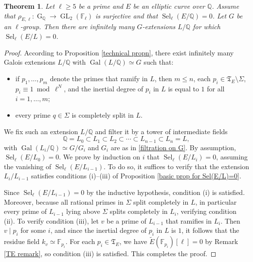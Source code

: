 \documentclass[11pt,reqno]{amsart}
\newtheorem{theorem}{Theorem}[section]
\newcommand{\Q}{\mathbb{Q}}
\newcommand{\F}{\mathbb{F}}
\newcommand{\op}[1]{\operatorname{#1}}
\numberwithin{equation}{section}
\begin{document}
\begin{theorem}\label{thm of section 3}
    Let $\ell\geq 5$ be a prime and $E$ be an elliptic curve over $\Q$. Assume that $\rho_{E,\ell}:\op{G}_{\Q}\rightarrow \op{GL}_2(\F_\ell)$ is surjective and that $\op{Sel}_\ell(E/\Q)=0$. Let $G$ be an $\ell$-group. Then there are infinitely many $G$-extensions $L/\Q$ for which $\op{Sel}_\ell(E/L)=0$.
\end{theorem}
\begin{proof}
 According to Proposition \ref{technical propn}, there exist infinitely many Galois extensions \( L/\Q \) with {\( \operatorname{Gal}(L/\Q) \simeq G \)} such that:
\begin{itemize}
    \item if \( p_1, \dots, p_m \) denote the primes that ramify in \( L \), then \( m \leq n \), each \( p_i \in \mathfrak{T}_E \setminus \Sigma \), \( p_i \equiv 1 \bmod{\ell^N} \), and the inertial degree of \( p_i \) in \( L \) is equal to \( 1 \) for all \( i = 1, \dots, m \);
    \item every prime \( q \in \Sigma \) is completely split in \( L \).
\end{itemize}
We fix such an extension \( L/\Q \) and filter it by a tower of intermediate fields
\[
\Q = L_0 \subset L_1 \subset L_2 \subset \cdots \subset L_{n-1} \subset L_n = L,
\]
with \( \operatorname{Gal}(L_i/\Q) \simeq G/G_i \) and $G_i$ are as in \eqref{filtration on G}. By assumption, \( \operatorname{Sel}_\ell(E/L_0) = 0 \). We prove by induction on \( i \) that \( \operatorname{Sel}_\ell(E/L_i) = 0 \), assuming the vanishing of \( \operatorname{Sel}_\ell(E/L_{i-1}) \). To do so, it suffices to verify that the extension \( L_i/L_{i-1} \) satisfies conditions (i)--(iii) of Proposition \ref{basic prop for Sel(E/L)=0}.

Since \( \operatorname{Sel}_\ell(E/L_{i-1}) = 0 \) by the inductive hypothesis, condition (i) is satisfied. Moreover, because all rational primes in \( \Sigma \) split completely in \( L \), in particular every prime of \( L_{i-1} \) lying above \( \Sigma \) splits completely in \( L_i \), verifying condition (ii). To verify condition (iii), let \( v \) be a prime of \( L_{i-1} \) that ramifies in \( L_i \). Then \( v \mid p_i \) for some \( i \), and since the inertial degree of \( p_i \) in \( L \) is \( 1 \), it follows that the residue field \( k_v \simeq \F_{p_i} \). For each \( p_i \in \mathfrak{T}_E \), we have \( \widetilde{E}(\F_{p_i})[\ell] = 0 \) by Remark \ref{TE remark}, so condition (iii) is satisfied. This completes the proof.
\end{proof}
\end{document}
